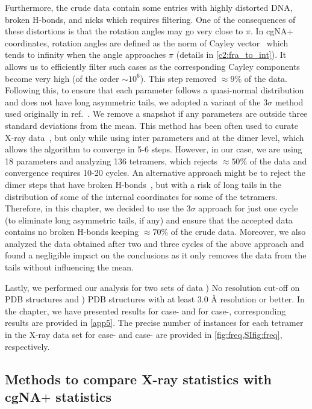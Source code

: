 Furthermore, the crude data contain some entries with highly distorted DNA, broken H-bonds, and nicks which requires filtering. 
One of the consequences of these distortions is that the rotation angles may go very close to $\pi$. 
In cgNA$+$ coordinates, rotation angles are defined as the norm of Cayley vector~\cite{petthesis,patelithesis} which tends to infinity when the angle approaches $\pi$ (details in \cref{c2:fra_to_int}).
It allows us to efficiently filter such cases as the corresponding Cayley components become very high (of the order $\sim 10^6$). 
This step removed $\approx 9\%$ of the data.
Following this, to ensure that each parameter follows a 
quasi-normal distribution and does not have long asymmetric tails, we adopted a variant of the $3\sigma$ method
used originally in ref.~\cite{xraydata}. We remove a snapshot if any parameters are outside three standard deviations from the mean. 
This method has been often used to curate X-ray data~\cite{xraydata,perez2004relative}, but only while using inter parameters and at the dimer level, which allows the algorithm to converge in 5-6 steps.
However, in our case, we are using 18 parameters and analyzing 136 tetramers, which rejects $\approx 50 \%$ of the data and convergence requires 10-20 cycles.
An alternative approach might be to reject the dimer steps that have broken H-bonds~\cite{fujii2007sequence}, but with a risk of long tails in the distribution of some of the internal coordinates for some of the tetramers.
Therefore, in this chapter, we decided to use the $3\sigma$ approach for just one cycle (to eliminate long asymmetric tails, if any) and ensure that the accepted data contains no broken H-bonds keeping $\approx 70 \%$ of the crude data.
Moreover, we also analyzed the data obtained after two and three cycles of the above
approach and found a negligible impact on the conclusions as it only removes the data from the tails without influencing the mean.


Lastly, we performed our analysis for two sets of data ) No resolution cut-off on PDB structures and ) PDB structures with at least 3.0 \AA \; resolution or better. 
In the chapter, we have presented results for case- and for case-, corresponding results are provided in \cref{app5}.
The precise number of instances for each tetramer in the X-ray data set for case- and case- are provided in \cref{fig:freq,SIfig:freq}, respectively.

\subsection{Methods to compare X-ray statistics with cgNA$+$ statistics}
